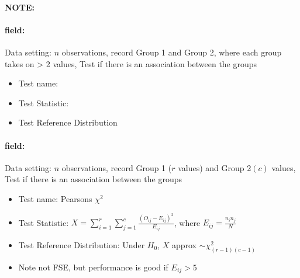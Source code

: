 \documentclass[12pt]{article}
\newenvironment{note}{\paragraph{NOTE:}}{}
\newenvironment{field}{\paragraph{field:}}{}
\begin{document}
\begin{note}
  \begin{field}
    Data setting: $n$ observations, record Group 1 and Group 2, where each group takes on > 2 values, Test if there is an association between the groups
    \begin{itemize}
      \item Test name:
      \item Test Statistic:
      \item Test Reference Distribution
    \end{itemize}
  \end{field}
  \begin{field}
    Data setting: $n$ observations, record Group 1 ($r$ values) and Group 2$(c)$ values, Test if there is an association between the groups
    \begin{itemize}
      \item Test name: Pearsons $\chi^2$
      \item Test Statistic: $X = \sum_{i=1}^r \sum_{j=1}^c \frac{(O_{ij} - E_{ij})^2}{E_{ij}}$, where $E_{ij} = \frac{n_in_j}{N}$
      \item Test Reference Distribution: Under $H_0$, $X$ approx $\sim \chi^2_{(r-1)(c-1)}$
      \item Note not FSE, but performance is good if $E_{ij} > 5$
    \end{itemize}
  \end{field}
\end{note}
\end{document}
